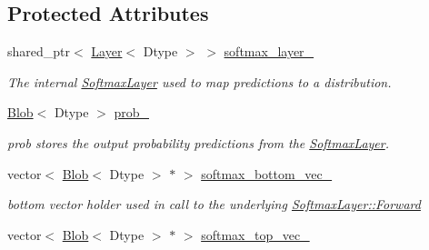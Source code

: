 \subsection*{Protected Attributes}
\begin{DoxyCompactItemize}
\item 
shared\+\_\+ptr$<$ \hyperlink{classcaffe_1_1Layer}{Layer}$<$ Dtype $>$ $>$ \hyperlink{classcaffe_1_1InfogainLossLayer_a1992ffcac64ab6d61ebce80c7d9e8405}{softmax\+\_\+layer\+\_\+}\hypertarget{classcaffe_1_1InfogainLossLayer_a1992ffcac64ab6d61ebce80c7d9e8405}{}\label{classcaffe_1_1InfogainLossLayer_a1992ffcac64ab6d61ebce80c7d9e8405}

\begin{DoxyCompactList}\small\item\em The internal \hyperlink{classcaffe_1_1SoftmaxLayer}{Softmax\+Layer} used to map predictions to a distribution. \end{DoxyCompactList}\item 
\hyperlink{classcaffe_1_1Blob}{Blob}$<$ Dtype $>$ \hyperlink{classcaffe_1_1InfogainLossLayer_a4ae881c2950ca84a50b0f964797defd6}{prob\+\_\+}\hypertarget{classcaffe_1_1InfogainLossLayer_a4ae881c2950ca84a50b0f964797defd6}{}\label{classcaffe_1_1InfogainLossLayer_a4ae881c2950ca84a50b0f964797defd6}

\begin{DoxyCompactList}\small\item\em prob stores the output probability predictions from the \hyperlink{classcaffe_1_1SoftmaxLayer}{Softmax\+Layer}. \end{DoxyCompactList}\item 
vector$<$ \hyperlink{classcaffe_1_1Blob}{Blob}$<$ Dtype $>$ $\ast$ $>$ \hyperlink{classcaffe_1_1InfogainLossLayer_ad919452e3fbb182cf56ded1e32ee001d}{softmax\+\_\+bottom\+\_\+vec\+\_\+}\hypertarget{classcaffe_1_1InfogainLossLayer_ad919452e3fbb182cf56ded1e32ee001d}{}\label{classcaffe_1_1InfogainLossLayer_ad919452e3fbb182cf56ded1e32ee001d}

\begin{DoxyCompactList}\small\item\em bottom vector holder used in call to the underlying \hyperlink{classcaffe_1_1Layer_aa5fc9ddb31b58958653372bdaaccde94}{Softmax\+Layer\+::\+Forward} \end{DoxyCompactList}\item 
vector$<$ \hyperlink{classcaffe_1_1Blob}{Blob}$<$ Dtype $>$ $\ast$ $>$ \hyperlink{classcaffe_1_1InfogainLossLayer_abce0ff34e57ed3660e39633535c97e41}{softmax\+\_\+top\+\_\+vec\+\_\+}\hypertarget{classcaffe_1_1InfogainLossLayer_abce0ff34e57ed3660e39633535c97e41}{}\label{classcaffe_1_1InfogainLossLayer_abce0ff34e57ed3660e39633535c97e41}


\end{DoxyCompactItemize}
